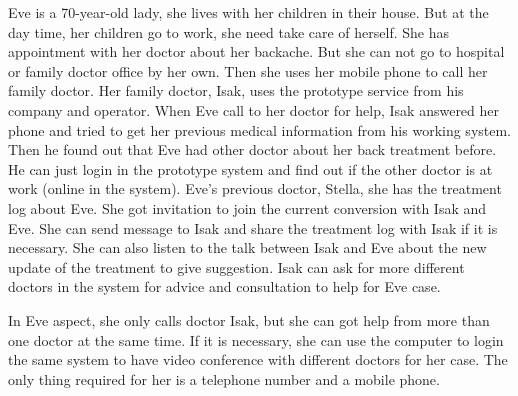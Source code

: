 \par Eve is a 70-year-old lady, she lives with her children in their house. But at the day time, her children go to work, she need take care of herself. She has appointment with her doctor about her backache. But she can not go to hospital or family doctor office by her own. Then she uses her mobile phone to call her family doctor. Her family doctor, Isak, uses the prototype service from his company and operator. When Eve call to her doctor for help, Isak answered her phone and tried to get her previous medical information from his working system. Then he found out that Eve had other doctor about her back treatment before. He can just login in the prototype system and find out if the other doctor is at work (online in the system). Eve's previous doctor, Stella, she has the treatment log about Eve. She got invitation to join the current conversion with Isak and Eve. She can send message to Isak and share the treatment log with Isak if it is necessary. She can also listen to the talk between Isak and Eve about the new update of the treatment to give suggestion. Isak can ask for more different doctors in the system for advice and consultation to help for Eve case.

\par In Eve aspect, she only calls doctor Isak, but she can got help from more than one doctor at the same time. If it is necessary, she can use the computer to login the same system to have video conference with different doctors for her case. The only thing required for her is a telephone number and a mobile phone.